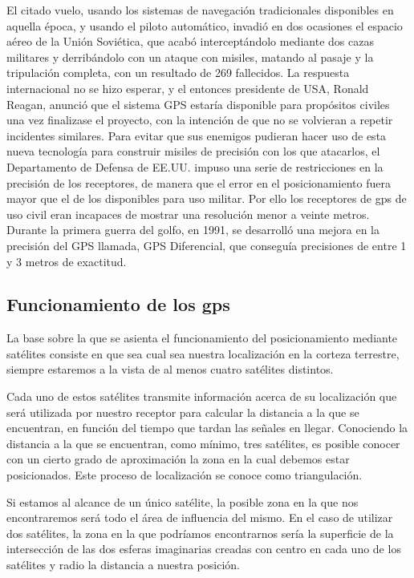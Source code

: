 El citado vuelo, usando los sistemas de navegación tradicionales disponibles en aquella época, y
usando el piloto automático, invadió en dos ocasiones el espacio aéreo de la Unión Soviética,
que acabó interceptándolo mediante dos cazas militares y derribándolo con un ataque con
misiles, matando al pasaje y la tripulación completa, con un resultado de 269 fallecidos.
La respuesta internacional no se hizo esperar, y el entonces presidente de \ac{USA}, Ronald Reagan,
anunció que el sistema \ac{GPS} estaría disponible para propósitos civiles una vez finalizase el
proyecto, con la intención de que no se volvieran a repetir incidentes similares.
 Para evitar que sus enemigos pudieran hacer uso de esta nueva tecnología para construir
misiles de precisión con los que atacarlos, el Departamento de Defensa de \ac{EE.UU.} impuso una
serie de restricciones en la precisión de los receptores, de manera que el error en el
posicionamiento fuera mayor que el de los disponibles para uso militar. Por ello los receptores de gps de uso
civil eran incapaces de mostrar una resolución menor a veinte metros.
Durante la primera guerra del golfo, en 1991, se desarrolló una mejora en la precisión del \ac{GPS}
llamada, \ac{GPS} Diferencial, que conseguía precisiones de entre 1 y 3 metros de exactitud.

\subsection{Funcionamiento de los gps}

La base sobre la que se asienta el funcionamiento del posicionamiento mediante satélites consiste en que sea cual sea nuestra localización en la corteza terrestre, siempre estaremos a la vista de al menos cuatro satélites distintos.

Cada uno de estos satélites transmite información acerca de su localización que será utilizada por nuestro receptor para calcular la distancia a la que se encuentran, en función del tiempo que tardan las señales en llegar.
Conociendo la distancia a la que se encuentran, como mínimo, tres satélites, es posible conocer con un cierto grado de aproximación la zona en la cual debemos estar posicionados. Este proceso de localización se conoce como triangulación.

Si estamos al alcance de un único satélite, la posible zona en la que nos encontraremos será todo el área de influencia del mismo. En el caso de utilizar dos satélites, la zona en la que podríamos encontrarnos sería la superficie de la intersección de las dos esferas imaginarias creadas con centro en cada uno de los satélites y radio la distancia a nuestra posición.

